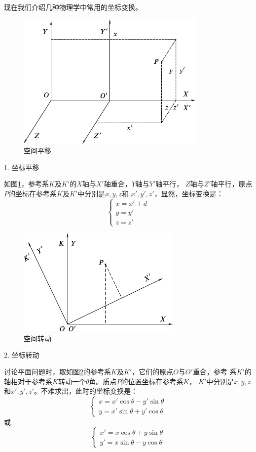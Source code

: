现在我们介绍几种物理学中常用的坐标变换。

\begin{figure}
  \centering
  \includegraphics{figure/fig02.02}
  \caption{空间平移}
  \label{fig:02.02}
\end{figure}
\textsf{1. 坐标平移}

如图\ref{fig:02.02}，参考系$K$及$K'$的$X$轴与$X'$轴重合，$Y$轴与$Y'$轴平行，
$Z$轴与$Z'$轴平行，原点$P$的坐标在参考系$K$及$K'$中分别是$x,y,z$和
$x',y',z'$，显然，坐标变换是：
\begin{equation}\label{eqn:02.02.03}
  \left\{\begin{array}{l}
    x=x'+d \\
    y=y'   \\
    z=z'
  \end{array}\right.
\end{equation}

\begin{figure}
  \centering
  \includegraphics{figure/fig02.03}
  \caption{空间转动}
  \label{fig:02.03}
\end{figure}
\textsf{2. 坐标转动}

讨论平面问题时，取如图\ref{fig:02.03}的参考系$K$及$K'$，它们的原点$O$与$O'$重合，参考
系$K'$的轴相对于参考系$ K $转动一个$\theta$角。质点$P$的位置坐标在参考系$K$，
$K'$中分别是$x,y,z$和$x',y',z'$。不难求出，此时的坐标变换是：
\begin{equation}\label{eqn:02.02.04}
  \left\{\begin{array}{l}
    x=x'\cos\theta-y'\sin\theta \\
    y=x'\sin\theta+y'\cos\theta
  \end{array}\right.
\end{equation}
或
\begin{equation*}
  \left\{\begin{array}{l}
    x'=x\cos\theta+y\sin\theta \\
    y'=x\sin\theta-y\cos\theta
  \end{array}\right.
\end{equation*}

